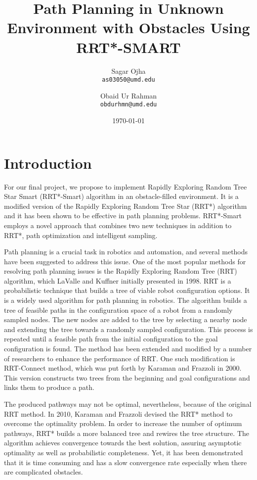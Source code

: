 \documentclass[12pt]{extarticle}
\title{Path Planning in Unknown Environment with Obstacles Using RRT*-SMART}
\author{
	Sagar Ojha \\
	\texttt{as03050@umd.edu}
	\and
	Obaid Ur Rahman\\
	\texttt{obdurhmn@umd.edu}}
\date{\today}
\begin{document}
\maketitle
\newpage
\section{Introduction}
\hspace{\parindent}For our final project, we propose to implement Rapidly Exploring Random Tree Star Smart (RRT*-Smart) algorithm in an obstacle-filled environment. It is a modified version of the Rapidly Exploring Random Tree Star (RRT*) algorithm and it has been shown to be effective in path planning problems. RRT*-Smart employs a novel approach that combines two new techniques in addition to RRT*, path optimization and intelligent sampling.

Path planning is a crucial task in robotics and automation, and several methods have been suggested to address this issue. One of the most popular methods for resolving path planning issues is the Rapidly Exploring Random Tree (RRT) algorithm, which LaValle and Kuffner \cite{La} initially presented in 1998. RRT is a probabilistic technique that builds a tree of viable robot configuration options. It is a widely used algorithm for path planning in robotics. The algorithm builds a tree of feasible paths in the configuration space of a robot from a randomly sampled nodes. The new nodes are added to the tree by selecting a nearby node and extending the tree towards a randomly sampled configuration. This process is repeated until a feasible path from the initial configuration to the goal configuration is found. The method has been extended and modified by a number of researchers to enhance the performance of RRT. One such modification is RRT-Connect method, which was put forth by Karaman and Frazzoli in 2000. This version constructs two trees from the beginning and goal configurations and links them to produce a path.

The produced pathways may not be optimal, nevertheless, because of the original RRT method. In 2010, Karaman and Frazzoli \cite{Kar} devised the RRT* method to overcome the optimality problem. In order to increase the number of optimum pathways, RRT* builds a more balanced tree and rewires the tree structure. The algorithm achieves convergence towards the best solution, assuring asymptotic optimality as well as probabilistic completeness. Yet, it has been demonstrated that it is time consuming and has a slow convergence rate especially when there are complicated obstacles.
\end{document}
